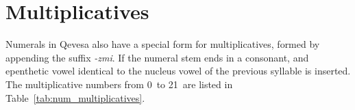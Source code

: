 \documentclass[grammar]{subfiles}
\begin{document}
	\begin{table}[htpb]\small\capstart
		\begin{center}
			\qquad
			\caption{Ordinal numerals from 0\dec\ to 21\dec\label{tab:num_ordinals}}
		\end{center}
	\end{table}

	\section{Multiplicatives}
	\label{sec:num_multiplicatives}

	Numerals in Qevesa also have a special form for multiplicatives, formed by appending the suffix \textit{-zmi}. If the numeral stem ends in a consonant, and epenthetic vowel identical to the nucleus vowel of the previous syllable is inserted. The multiplicative numbers from 0\dec\ to 21\dec\ are listed in Table~\ref{tab:num_multiplicatives}.
	
\end{document}

